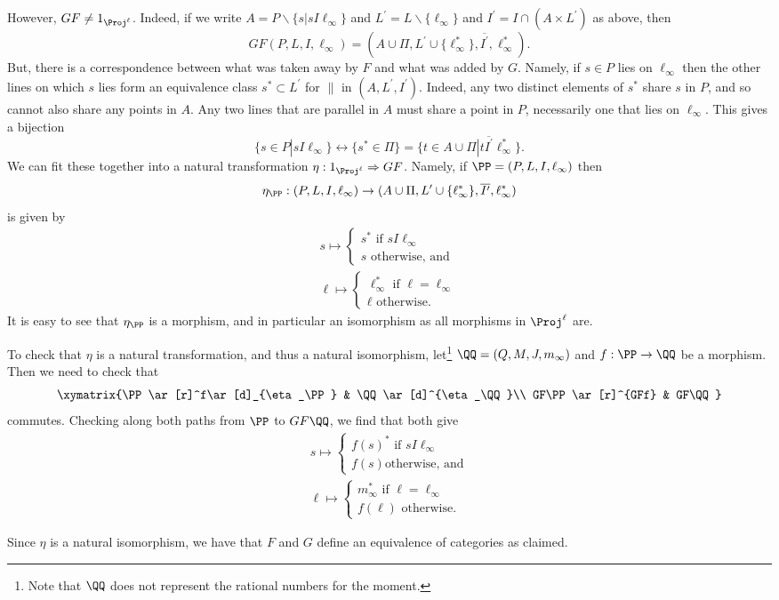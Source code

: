 \documentclass[main.tex]{subfiles}
\begin{document}
\subparagraph{}
However, $GF\ne 1_{\Proj^\ell}$. Indeed, if we write
$A=P\backslash\{s|sI\ell_\infty\}$ and $L^\prime =L\backslash\{\ell_\infty\}$
and $I^\prime=I\cap(A\times L^\prime)$ as above, then
\[GF(P,L,I,\ell_\infty)=(A\cup\Pi,
L^\prime\cup\{\ell^*_\infty\},\overline{I^\prime},\ell^*_\infty).\] But, there
is a correspondence between what was taken away by $F$ and what was added by
$G$. Namely, if $s\in P$ lies on $\ell_\infty$ then the other lines on which $s$
lies form an equivalence class $s^*\subset L^\prime$ for $\parallel$ in
$(A,L^\prime,I^\prime)$. Indeed, any two distinct elements of $s^*$ share $s$ in
$P$, and so cannot also share any points in $A$. Any two lines that are parallel
in  $A$ must share a point in $P$, necessarily one that lies on $\ell_\infty$.
This gives a bijection \[\{s\in
P|sI\ell_\infty\}\leftrightarrow\{s^*\in\Pi\}=\{t\in
A\cup\Pi|t\overline{I^\prime}\ell_\infty^*\}.\] We can fit these together into a
natural transformation $\eta:1_{\Proj^\ell}\Rightarrow GF$. Namely, if
$\PP=(P,L,I,\ell_\infty)$ then \[\eta_{\PP}:(P,L,I,\ell_\infty)\rightarrow
(A\cup\Pi, L^\prime\cup\{\ell^*_\infty\},\overline{I^\prime},\ell^*_\infty)\] is
given by
\[\begin{array}{l}
		s\mapsto\begin{cases} s^*\text{ if }sI\ell_\infty\\ s\text{ otherwise,
		and}\end{cases}\\
		\ell\mapsto\begin{cases} \ell^*_\infty\text{ if }\ell=\ell_\infty\\
		\ell\text{ otherwise.}\end{cases}
	\end{array}
\]
It is easy to see that $\eta_{\PP}$ is a morphism, and in particular an
isomorphism as all morphisms in $\Proj^\ell$ are.

To check that $\eta$ is a natural transformation, and thus a natural
isomorphism, let\footnote{Note that $\QQ$ does not represent the rational
numbers for the moment.} $\QQ=(Q,M,J,m_\infty)$ and $f:\PP\rightarrow\QQ$ be a
morphism. Then we need to check that \[\xymatrix{\PP\ar[r]^f\ar[d]_{\eta_\PP} &
\QQ\ar[d]^{\eta_\QQ}\\ GF\PP\ar[r]^{GFf} & GF\QQ}\] commutes. Checking along
both paths from $\PP$ to $GF\QQ$, we find that both give
\[\begin{array}{l}
		s\mapsto\begin{cases} f(s)^*\text{ if }sI\ell_\infty\\ f(s)\text{
		otherwise, and}\end{cases}\\
		\ell\mapsto\begin{cases} m^*_\infty\text{ if }\ell=\ell_\infty\\
		f(\ell)\text{ otherwise.}\end{cases}
	\end{array}
\]

Since $\eta$ is a natural isomorphism, we have that $F$ and $G$ define an
equivalence of categories as claimed.
\end{document}
